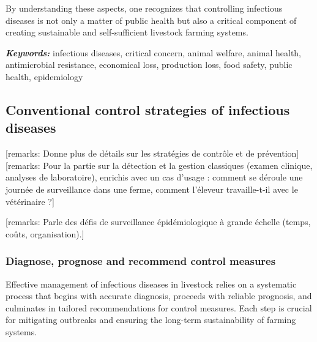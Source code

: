 By understanding these aspects, one recognizes that controlling infectious diseases is not only a matter of public health but also a critical component of creating sustainable and self-sufficient livestock farming systems.

\textit{\textbf{Keywords:}} infectious diseases, critical concern, animal welfare, animal health, antimicrobial resistance, economical loss, production loss, food safety, public health, epidemiology


\subsection{Conventional control strategies of infectious diseases}
\label{Conventional control strategies} %


[remarks: Donne plus de détails sur les stratégies de contrôle et de prévention]
[remarks: Pour la partie sur la détection et la gestion classiques (examen clinique, analyses de laboratoire), enrichis avec un cas d’usage : comment se déroule une journée de surveillance dans une ferme, comment l’éleveur travaille-t-il avec le vétérinaire ?]

[remarks: Parle des défis de surveillance épidémiologique à grande échelle (temps, coûts, organisation).]

\subsubsection{Diagnose, prognose and recommend control measures}

Effective management of infectious diseases in livestock relies on a systematic process that begins with accurate diagnosis, proceeds with reliable prognosis, and culminates in tailored recommendations for control measures. Each step is crucial for mitigating outbreaks and ensuring the long-term sustainability of farming systems.

